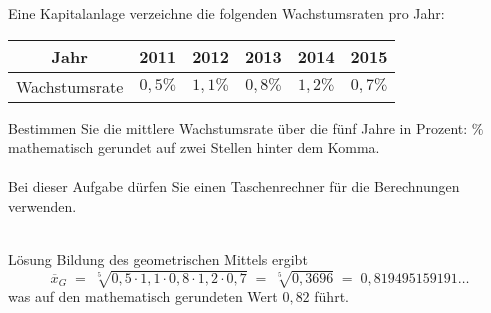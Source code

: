 \begin{MIntro}
\begin{MExercise}
Eine Kapitalanlage verzeichne die folgenden Wachstumsraten pro Jahr:
\begin{center}
\begin{tabular}{|c|c|c|c|c|c|}
\hline
Jahr           & 2011 & 2012 & 2013 & 2014 & 2015 \\ \hline
Wachstumsrate  & $0,5\%$ & $1,1\%$ & $0,8\%$ & $1,2\%$ &  $0,7\%$ \\ \hline
\end{tabular}
\end{center}
Bestimmen Sie die mittlere Wachstumsrate über die fünf Jahre in Prozent:  $\%$ mathematisch gerundet auf zwei Stellen hinter dem Komma.
\ \\ \ \\
Bei dieser Aufgabe dürfen Sie einen Taschenrechner für die Berechnungen verwenden.
\ \\ \ \\
\begin{MHint}{Lösung}
Bildung des geometrischen Mittels ergibt
$$
\overline{x}_G\; =\; \sqrt[5]{0,5\cdot 1,1\cdot 0,8\cdot 1,2\cdot 0,7}\; =\; \sqrt[5]{0,3696}\; =\; 0,819495159191\ldots
$$
was auf den mathematisch gerundeten Wert $0,82$ führt.
\end{MHint}
\end{MExercise}

\end{MIntro}

